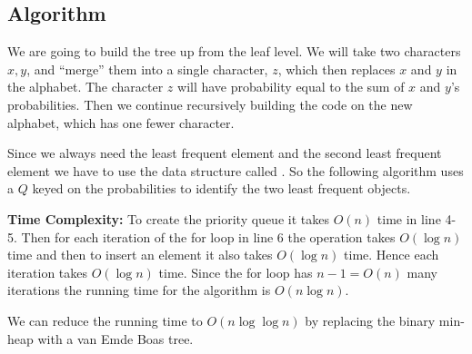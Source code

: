\subsection{Algorithm}
\begin{idea}
	We are going to build the tree up from the leaf level. We will take two characters $x,y$, and ``merge” them into a single character, $z$, which then replaces $x$ and $y$ in the alphabet. The character $z$ will have  probability
	equal to the sum of $x$ and $y$’s probabilities. Then we continue recursively building the code on
	the new alphabet, which has one fewer character.
\end{idea}

Since we always need the least frequent element and the second least frequent element we have to use the data structure called . So the following algorithm uses a  $Q$ keyed on the probabilities to identify the two least frequent objects. 

\newpage 
\begin{algorithm}
	\DontPrintSemicolon
\caption{$(A,P)$}
\end{algorithm}

\parinf
\textbf{Time Complexity:} To create the priority queue it takes $O(n)$ time in line 4-5. Then for each iteration of the for loop in line 6 the  operation takes $O(\log n)$ time and then to insert an element it also takes $O(\log n)$ time. Hence each iteration takes $O(\log n)$ time. Since the for loop has $n-1=O(n)$ many iterations the running time for the algorithm is $O(n\log n)$. 

\begin{remark}
	We can reduce the running time to $O(n\log\log n)$ by replacing the binary min-heap with a van Emde Boas tree.
\end{remark}

